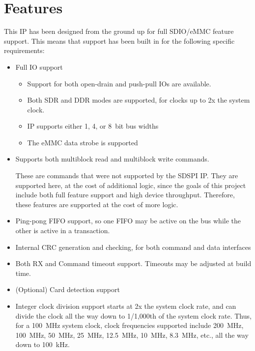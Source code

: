 \documentclass{gqtekspec}
\begin{document}
\chapter{Features}\label{ch:features}
This IP has been designed from the ground up for full SDIO/eMMC feature
support.  This means that support has been built in for the following
specific requirements:

\begin{itemize}
\item Full IO support
	\begin{itemize}
	\item Support for both open-drain and push-pull IOs are available.
	\item Both SDR and DDR modes are supported, for clocks up
		to 2x the system clock.
	\item IP supports either 1, 4, or 8~bit bus widths
	\item The eMMC data strobe is supported
	\end{itemize}	

\item Supports both multiblock read and multiblock write commands.

	These are commands that were not supported by the SDSPI IP.  They
	are supported here, at the cost of additional logic, since the
	goals of this project include both full feature support and high
	device throughput.  Therefore, these features are supported at the
	cost of more logic.

\item Ping-pong FIFO support, so one FIFO may be active on the bus while the
	other is active in a transaction.

\item Internal CRC generation and checking, for both command and data
	interfaces

\item Both RX and Command timeout support.  Timeouts may be adjusted at build
	time.

\item (Optional) Card detection support

\item Integer clock division support starts at 2x the system clock rate,
	and can divide the clock all the way down to 1/1,000th of the system
	clock rate.  Thus, for a 100~MHz system clock, clock frequencies
	supported include 200~MHz, 100~MHz, 50~MHz, 25~MHz, 12.5~MHz, 10~MHz,
	8.3~MHz, etc.,  all the way down to 100~kHz.


\end{itemize}
\end{document}
